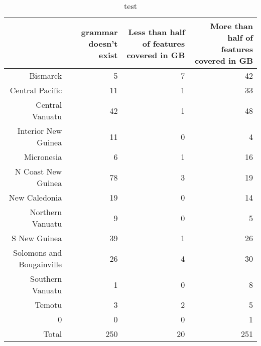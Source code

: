 \begin{table}[ht]
\centering
\begin{tabular}{rrrr}
  \hline
 & grammar doesn't exist & Less than half of features covered in GB & More than half of features covered in GB \\ 
  \hline
Bismarck & 5 & 7 & 42 \\ 
  Central Pacific & 11 & 1 & 33 \\ 
  Central Vanuatu & 42 & 1 & 48 \\ 
  Interior New Guinea & 11 & 0 & 4 \\ 
  Micronesia & 6 & 1 & 16 \\ 
  N Coast New Guinea & 78 & 3 & 19 \\ 
  New Caledonia & 19 & 0 & 14 \\ 
  Northern Vanuatu & 9 & 0 & 5 \\ 
  S New Guinea & 39 & 1 & 26 \\ 
  Solomons and Bougainville & 26 & 4 & 30 \\ 
  Southern Vanuatu & 1 & 0 & 8 \\ 
  Temotu & 3 & 2 & 5 \\ 
  0 & 0 & 0 & 1 \\ 
  Total & 250 & 20 & 251 \\ 
   \hline
\end{tabular}
\caption{test} 
\end{table}
